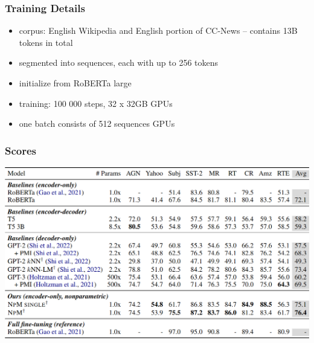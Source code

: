 \documentclass{beamer}
\begin{document}
\begin{frame}
    \frametitle{Training Details}
    \begin{itemize}
        \item corpus: English Wikipedia and English portion of CC-News -- contains 13B tokens in total
        \item segmented into sequences, each with up to 256 tokens
        \item initialize from RoBERTa large
        \item training: 100 000 steps, 32 x 32GB GPUs
        \item one batch consists of 512 sequences
GPUs
    \end{itemize}
\end{frame}

\begin{frame}
    \frametitle{Scores}
    \begin{center}
        \includegraphics[scale=1.24]{img/npm-scores.png}
    \end{center}
\end{frame}
\end{document}
